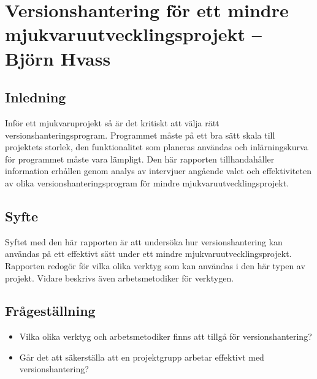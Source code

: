 

\chapter{Versionshantering för ett mindre mjukvaruutvecklingsprojekt -- Björn Hvass}



\vspace{1.5em}
\section{Inledning}
Inför ett mjukvaruprojekt så är det kritiskt att välja rätt versionshanteringsprogram. Programmet måste på ett bra sätt skala till projektets storlek, den funktionalitet som planeras användas och inlärningskurva för programmet måste vara lämpligt. Den här rapporten tillhandahåller information erhållen genom analys av intervjuer angående valet och effektiviteten av olika versionshanteringsprogram för mindre mjukvaruutvecklingsprojekt.

\vspace{1.5em}
\section{Syfte}
Syftet med den här rapporten är att undersöka hur versionshantering kan användas på ett effektivt sätt under ett mindre mjukvaruutvecklingsprojekt. Rapporten redogör för vilka olika verktyg som kan användas i den här typen av projekt. Vidare beskrivs även arbetsmetodiker för verktygen.

\vspace{1.5em}
\section{Frågeställning}
\begin{itemize} \vspace{1em}
    \item Vilka olika verktyg och arbetsmetodiker finns att tillgå för versionshantering?
    \item Går det att säkerställa att en projektgrupp arbetar effektivt med versionshantering?

\end{itemize}


